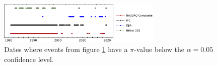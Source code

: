 \documentclass[a4paper]{jpconf}
\begin{document}
\begin{figure}[h!tb]
	\label{fig:PiValuesAD}
\end{figure}

\begin{figure}
\begin{center}
\includegraphics[width=0.70\textwidth]{img/not_eff_dates}
\end{center}
\caption{\small \label{fig:not_geom}Dates where events from figure \ref{fig:PiValuesAD} have a $\pi$-value below the $\alpha = 0.05$ confidence level.}
\end{figure}
\end{document}
